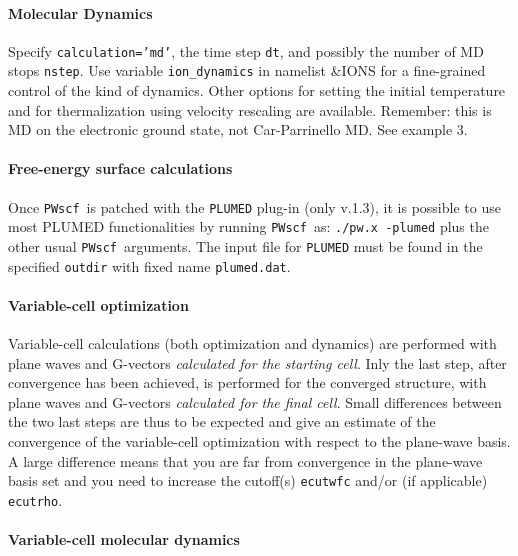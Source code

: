\documentclass[12pt,a4paper]{article}
\def\PWscf{\texttt{PWscf}}
\begin{document}
\paragraph{Molecular Dynamics} 
Specify \texttt{calculation='md'}, the time step \texttt{dt},
and possibly the number of MD stops \texttt{nstep}.
Use variable \texttt{ion\_dynamics} in namelist \&IONS
for a fine-grained control of the kind of dynamics.
Other options for setting the initial temperature
and for thermalization using velocity rescaling are available.
Remember: this is MD on the electronic ground state, not
Car-Parrinello MD.
See example 3.

\paragraph{Free-energy surface calculations}

Once \PWscf\ is patched with the \texttt{PLUMED} plug-in
(only v.1.3), it is possible to 
use most PLUMED functionalities by running \PWscf\ as: 
\texttt{./pw.x -plumed} plus the other usual \PWscf\ arguments.
The input file for \texttt{PLUMED} must be found in the specified 
\texttt{outdir} with fixed name \texttt{plumed.dat}.

\paragraph{Variable-cell optimization}

Variable-cell calculations (both optimization and dynamics) are performed
with plane waves and G-vectors {\em calculated for the starting cell}.
Inly the last step, after convergence has been achieved, is performed
for the converged structure, with plane waves and G-vectors
{\em calculated for the final cell}. Small differences between the
two last steps are thus to be expected and give an estimate of the
convergence of the variable-cell optimization with respect to the
plane-wave basis. A large difference means that you are far from
convergence in the plane-wave basis set and you need to increase the
cutoff(s) \texttt{ecutwfc} and/or (if applicable) \texttt{ecutrho}.

\paragraph{Variable-cell molecular dynamics}
\end{document}
